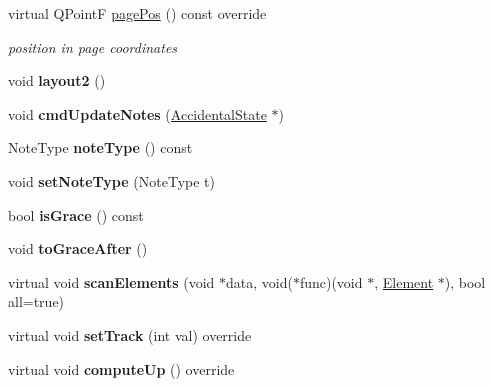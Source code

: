 \begin{DoxyCompactItemize}
virtual Q\+PointF \hyperlink{class_ms_1_1_chord_ae09938e55d32b1e62c0b0c4d85dcb812}{page\+Pos} () const override
\begin{DoxyCompactList}\small\item\em position in page coordinates \end{DoxyCompactList}\item 
\mbox{\label{class_ms_1_1_chord_a7788567e5b88177802f3941cfb1dda11}} 
void {\bfseries layout2} ()
\item 
\mbox{\label{class_ms_1_1_chord_a550c9abf9f41513672b152651e4c6a95}} 
void {\bfseries cmd\+Update\+Notes} (\hyperlink{class_ms_1_1_accidental_state}{Accidental\+State} $\ast$)
\item 
\mbox{\label{class_ms_1_1_chord_a480cf37fc1ac8fe3b97381dd8035552e}} 
Note\+Type {\bfseries note\+Type} () const
\item 
\mbox{\label{class_ms_1_1_chord_ae92c92e55132a776b975e3755b38ff14}} 
void {\bfseries set\+Note\+Type} (Note\+Type t)
\item 
\mbox{\label{class_ms_1_1_chord_a6071a1241456ef93c8a06c62269090a7}} 
bool {\bfseries is\+Grace} () const
\item 
\mbox{\label{class_ms_1_1_chord_aa1c65a7f3a3704de2d1a3e0b8d6c1b64}} 
void {\bfseries to\+Grace\+After} ()
\item 
\mbox{\label{class_ms_1_1_chord_a1e00f8cda256dbf94414c2463cd4e21c}} 
virtual void {\bfseries scan\+Elements} (void $\ast$data, void($\ast$func)(void $\ast$, \hyperlink{class_ms_1_1_element}{Element} $\ast$), bool all=true)
\item 
\mbox{\label{class_ms_1_1_chord_a9ef10daa63efa6b649084a4be6abe196}} 
virtual void {\bfseries set\+Track} (int val) override
\item 
\mbox{\label{class_ms_1_1_chord_a33b64f9292f5e20eb55a8013e977b722}} 
virtual void {\bfseries compute\+Up} () override
\item 
\mbox{\label{class_ms_1_1_chord_ad11d82b99c9fa25362378d6ae31d1f97}} 

\end{DoxyCompactItemize}
